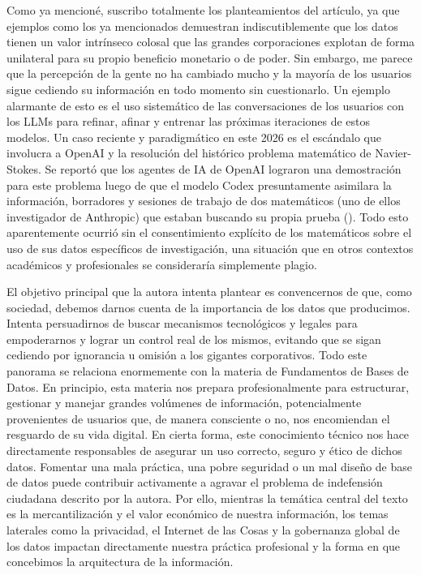 Como ya mencioné, suscribo totalmente los planteamientos del artículo, ya que ejemplos como los ya mencionados demuestran indiscutiblemente que los datos tienen un valor intrínseco colosal que las grandes corporaciones explotan de forma unilateral para su propio beneficio monetario o de poder.
Sin embargo, me parece que la percepción de la gente no ha cambiado mucho y la mayoría de los usuarios sigue cediendo su información en todo momento sin cuestionarlo.
Un ejemplo alarmante de esto es el uso sistemático de las conversaciones de los usuarios con los LLMs para refinar, afinar y entrenar las próximas iteraciones de estos modelos.
Un caso reciente y paradigmático en este 2026 es el escándalo que involucra a OpenAI y la resolución del histórico problema matemático de Navier-Stokes.
Se reportó que los agentes de IA de OpenAI lograron una demostración para este problema luego de que el modelo Codex presuntamente asimilara la información, borradores y sesiones de trabajo de dos matemáticos (uno de ellos investigador de Anthropic) que estaban buscando su propia prueba (\cite{quanta2026navier}).
Todo esto aparentemente ocurrió sin el consentimiento explícito de los matemáticos sobre el uso de sus datos específicos de investigación, una situación que en otros contextos académicos y profesionales se consideraría simplemente plagio.

El objetivo principal que la autora intenta plantear es convencernos de que, como sociedad, debemos darnos cuenta de la importancia de los datos que producimos.
Intenta persuadirnos de buscar mecanismos tecnológicos y legales para empoderarnos y lograr un control real de los mismos, evitando que se sigan cediendo por ignorancia u omisión a los gigantes corporativos.
Todo este panorama se relaciona enormemente con la materia de Fundamentos de Bases de Datos.
En principio, esta materia nos prepara profesionalmente para estructurar, gestionar y manejar grandes volúmenes de información, potencialmente provenientes de usuarios que, de manera consciente o no, nos encomiendan el resguardo de su vida digital.
En cierta forma, este conocimiento técnico nos hace directamente responsables de asegurar un uso correcto, seguro y ético de dichos datos.
Fomentar una mala práctica, una pobre seguridad o un mal diseño de base de datos puede contribuir activamente a agravar el problema de indefensión ciudadana descrito por la autora.
Por ello, mientras la temática central del texto es la mercantilización y el valor económico de nuestra información, los temas laterales como la privacidad, el Internet de las Cosas y la gobernanza global de los datos impactan directamente nuestra práctica profesional y la forma en que concebimos la arquitectura de la información.

